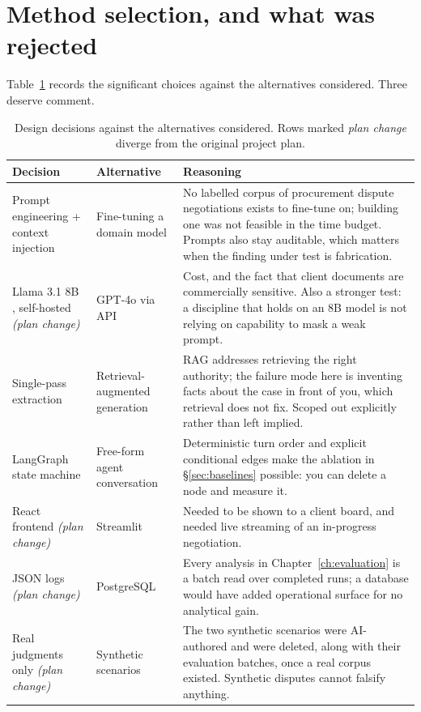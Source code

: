 \section{Method selection, and what was rejected}
\label{sec:alternatives}

Table~\ref{tab:alternatives} records the significant choices against the
alternatives considered. Three deserve comment.

\begin{table}[htbp]
\centering
\footnotesize
\caption[Design alternatives]{Design decisions against the alternatives considered.
Rows marked \emph{plan change} diverge from the original project plan.}
\label{tab:alternatives}
\begin{tabular}{@{}p{2.6cm}p{3.0cm}p{6.4cm}@{}}
\toprule
\textbf{Decision} & \textbf{Alternative} & \textbf{Reasoning} \\
\midrule
Prompt engineering + context injection & Fine-tuning a domain model &
  No labelled corpus of procurement dispute negotiations exists to fine-tune on;
  building one was not feasible in the time budget. Prompts also stay auditable,
  which matters when the finding under test is fabrication. \\
Llama 3.1 8B \cite{grattafiori2024llama}, self-hosted \emph{(plan change)} & GPT-4o via API &
  Cost, and the fact that client documents are commercially sensitive. Also a
  stronger test: a discipline that holds on an 8B model is not relying on
  capability to mask a weak prompt. \\
Single-pass extraction & Retrieval-augmented generation &
  RAG addresses retrieving the right authority; the failure mode here is inventing
  facts about the case in front of you, which retrieval does not fix. Scoped out
  explicitly rather than left implied. \\
LangGraph state machine & Free-form agent conversation &
  Deterministic turn order and explicit conditional edges make the ablation in
  \S\ref{sec:baselines} possible: you can delete a node and measure it. \\
React frontend \emph{(plan change)} & Streamlit &
  Needed to be shown to a client board, and needed live streaming of an
  in-progress negotiation. \\
JSON logs \emph{(plan change)} & PostgreSQL &
  Every analysis in Chapter~\ref{ch:evaluation} is a batch read over completed
  runs; a database would have added operational surface for no analytical gain. \\
Real judgments only \emph{(plan change)} & Synthetic scenarios &
  The two synthetic scenarios were AI-authored and were deleted, along with their
  evaluation batches, once a real corpus existed. Synthetic disputes cannot
  falsify anything. \\
\bottomrule
\end{tabular}
\end{table}

